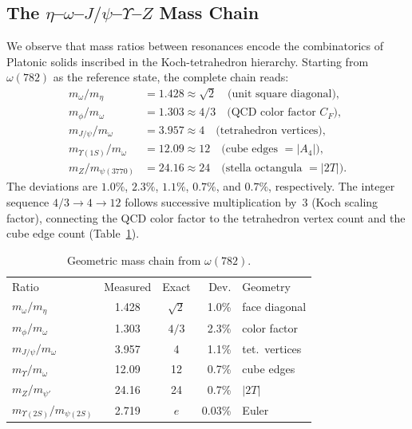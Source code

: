 \documentclass[twocolumn,showpacs,preprintnumbers,amsmath,amssymb,prl]{revtex4-2}
\begin{document}
\subsection{The $\eta$--$\omega$--$J/\psi$--$\Upsilon$--$Z$ Mass Chain}

We observe that mass ratios between resonances encode the combinatorics
of Platonic solids inscribed in the Koch-tetrahedron hierarchy.
Starting from $\omega(782)$ as the reference state, the complete chain
reads:
\begin{align}
    m_\omega / m_\eta &= 1.428 \approx \sqrt{2}
        \quad \text{(unit square diagonal)}, \label{eq:chain_sqrt2} \\
    m_\phi / m_\omega &= 1.303 \approx 4/3
        \quad \text{(QCD color factor $C_F$)}, \label{eq:chain_43} \\
    m_{J/\psi} / m_\omega &= 3.957 \approx 4
        \quad \text{(tetrahedron vertices)}, \label{eq:chain4} \\
    m_{\Upsilon(1S)} / m_\omega &= 12.09 \approx 12
        \quad \text{(cube edges $= |A_4|$)}, \label{eq:chain12} \\
    m_Z / m_{\psi(3770)} &= 24.16 \approx 24
        \quad \text{(stella octangula $= |2T|$)}.
        \label{eq:chain24}
\end{align}
The deviations are $1.0\%$, $2.3\%$, $1.1\%$, $0.7\%$, and $0.7\%$,
respectively. The integer sequence $4/3 \to 4 \to 12$ follows
successive multiplication by~3 (Koch scaling factor),
connecting the QCD color factor to the tetrahedron vertex count
and the cube edge count (Table~\ref{tab:chain}).

\begin{table}[h]
\caption{Geometric mass chain from $\omega(782)$.}
\label{tab:chain}
\begin{ruledtabular}
\begin{tabular}{lccrl}
Ratio & Measured & Exact & Dev. & Geometry \\
\colrule
$m_\omega / m_\eta$     & 1.428 & $\sqrt{2}$ & 1.0\% & face diagonal \\
$m_\phi / m_\omega$     & 1.303 & $4/3$      & 2.3\% & color factor \\
$m_{J/\psi} / m_\omega$ & 3.957 & 4          & 1.1\% & tet.\ vertices \\
$m_\Upsilon / m_\omega$ & 12.09 & 12         & 0.7\% & cube edges \\
$m_Z / m_{\psi'}$       & 24.16 & 24         & 0.7\% & $|2T|$ \\
$m_{\Upsilon(2S)} / m_{\psi(2S)}$ & 2.719 & $e$ & 0.03\% & Euler \\
\end{tabular}
\end{ruledtabular}
\end{table}
\end{document}
